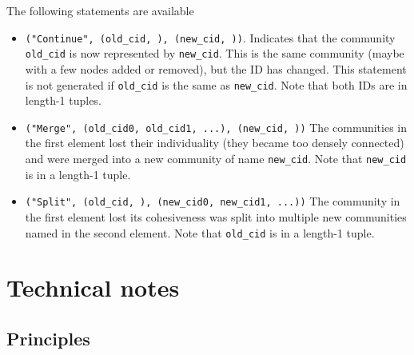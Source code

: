 \documentclass{article}
\begin{document}
The following statements are available
\begin{itemize}
\item \texttt{("Continue", (old\_cid, ), (new\_cid, ))}.  Indicates that the
  community \texttt{old\_cid} is now represented by \texttt{new\_cid}.
  This is the same community (maybe with a few nodes added or
  removed), but the ID has changed.  This statement is not generated
  if \texttt{old\_cid} is the same as \texttt{new\_cid}.  Note that
  both IDs are in length-1 tuples.
\item \texttt{("Merge", (old\_cid0, old\_cid1, ...), (new\_cid, ))} The
  communities in the first element lost their individuality (they
  became too densely connected) and were
  merged into a new community of name \texttt{new\_cid}.  Note that
  \texttt{new\_cid} is in a length-1 tuple.
\item \texttt{("Split", (old\_cid, ), (new\_cid0, new\_cid1, ...))}  The
  community in the first element lost its cohesiveness was split into
  multiple new communities named in the second element.  Note that
  \texttt{old\_cid} is in a length-1 tuple.
\end{itemize}



\section{Technical notes}
\label{sec:technical}

\subsection{Principles}
\label{sec:principles}
\end{document}
